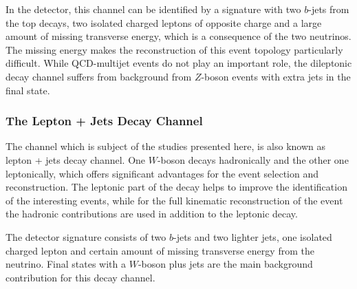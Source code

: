  In the detector, this channel can be identified by a  signature with two $b$-jets from the top decays, two isolated charged leptons of opposite charge and a large amount of missing transverse energy, which is  a consequence of the two neutrinos.
The missing energy makes the reconstruction of this event topology particularly difficult. While QCD-multijet events do not play an important role, the dileptonic decay channel suffers from background from $Z$-boson events with extra jets in the final state.   

\subsubsection{The Lepton + Jets  Decay Channel}
The channel which is subject of the studies presented here, is also known as lepton + jets decay channel. One $W$-boson decays hadronically and  the other one leptonically, which offers significant advantages for the event selection and reconstruction. The leptonic  part of the decay helps to improve the identification of the interesting   events, while for the full kinematic reconstruction of the event the hadronic contributions are used in addition to the leptonic decay. 

 The detector signature consists of two $b$-jets and two lighter jets, one isolated charged lepton and certain amount of missing transverse energy from the neutrino. Final states with a $W$-boson plus jets are the main background contribution for this decay channel.   
  

 
 \vspace{0.5cm} 
  
  
  
  
  
  
  
  
  
